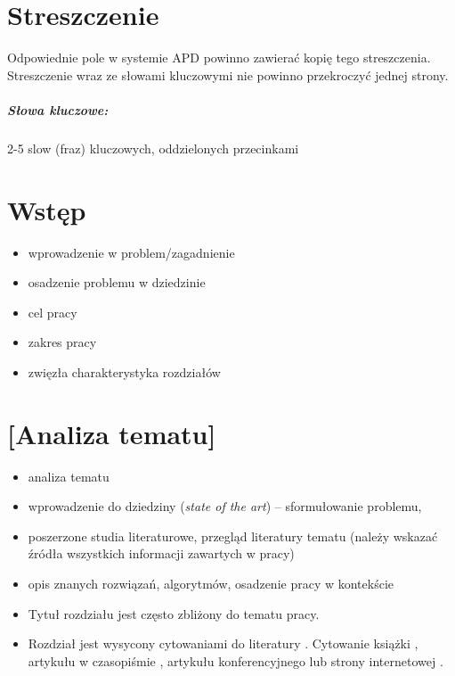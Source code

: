 \documentclass[a4paper,twoside,12pt]{book}
\newcommand{\obcy}[1]{\emph{#1}}
\newcommand{\ang}[1]{{\selectlanguage{british}\obcy{#1}}}
\newcounter{stronyPozaNumeracja}
\begin{document}
\pagestyle{tylkoNumeryStron}
\tableofcontents

\setcounter{stronyPozaNumeracja}{\value{page}}
\mainmatter


\pagestyle{empty}

\chapter*{Streszczenie}

Odpowiednie pole w systemie APD powinno zawierać kopię tego streszczenia. Streszczenie wraz ze słowami kluczowymi nie powinno przekroczyć jednej strony.

\paragraph{Słowa kluczowe:} 2-5 slow (fraz) kluczowych, oddzielonych przecinkami


\cleardoublepage

\pagestyle{NumeryStronNazwyRozdzialow}


\chapter{Wstęp}

\begin{itemize}
\item wprowadzenie w problem/zagadnienie 
\item osadzenie problemu w dziedzinie 
\item cel pracy 
\item zakres pracy 
\item zwięzła charakterystyka rozdziałów 
\end{itemize}


\chapter{[Analiza tematu]}


\begin{itemize}
\item analiza tematu
\item wprowadzenie do dziedziny (\ang{state of the art}) – sformułowanie problemu, 
\item poszerzone studia literaturowe, przegląd literatury tematu (należy wskazać źródła wszystkich informacji zawartych w pracy)
\item opis znanych rozwiązań, algorytmów, osadzenie pracy w kontekście
\item Tytuł rozdziału jest często zbliżony do tematu pracy. 
\item Rozdział jest wysycony cytowaniami do literatury \cite{bib:artykul,bib:ksiazka,bib:konferencja}. 
Cytowanie książki \cite{bib:ksiazka}, artykułu w czasopiśmie \cite{bib:artykul}, artykułu konferencyjnego \cite{bib:konferencja} lub strony internetowej \cite{bib:internet}.
\end{itemize}
\end{document}
